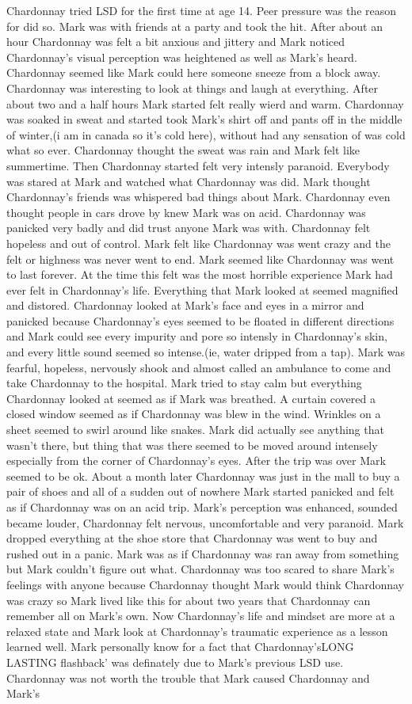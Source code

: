\documentclass[12pt]{book}
\begin{document}
Chardonnay tried LSD for the first time at age 14. Peer pressure was the reason for did so. Mark was with friends at a party and took the hit. After about an hour Chardonnay was felt a bit anxious and jittery and Mark noticed Chardonnay's visual perception was heightened as well as Mark's heard. Chardonnay seemed like Mark could here someone sneeze from a block away. Chardonnay was interesting to look at things and laugh at everything. After about two and a half hours Mark started felt really wierd and warm. Chardonnay was soaked in sweat and started took Mark's shirt off and pants off in the middle of winter,(i am in canada so it's cold here), without had any sensation of was cold what so ever. Chardonnay thought the sweat was rain and Mark felt like summertime. Then Chardonnay started felt very intensly paranoid. Everybody was stared at Mark and watched what Chardonnay was did. Mark thought Chardonnay's friends was whispered bad things about Mark. Chardonnay even thought people in cars drove by knew Mark was on acid. Chardonnay was panicked very badly and did trust anyone Mark was with. Chardonnay felt hopeless and out of control. Mark felt like Chardonnay was went crazy and the felt or highness was never went to end. Mark seemed like Chardonnay was went to last forever. At the time this felt was the most horrible experience Mark had ever felt in Chardonnay's life. Everything that Mark looked at seemed magnified and distored. Chardonnay looked at Mark's face and eyes in a mirror and panicked because Chardonnay's eyes seemed to be floated in different directions and Mark could see every impurity and pore so intensly in Chardonnay's skin, and every little sound seemed so intense.(ie, water dripped from a tap). Mark was fearful, hopeless, nervously shook and almost called an ambulance to come and take Chardonnay to the hospital. Mark tried to stay calm but everything Chardonnay looked at seemed as if Mark was breathed. A curtain covered a closed window seemed as if Chardonnay was blew in the wind. Wrinkles on a sheet seemed to swirl around like snakes. Mark did actually see anything that wasn't there, but thing that was there seemed to be moved around intensely especially from the corner of Chardonnay's eyes. After the trip was over Mark seemed to be ok. About a month later Chardonnay was just in the mall to buy a pair of shoes and all of a sudden out of nowhere Mark started panicked and felt as if Chardonnay was on an acid trip. Mark's perception was enhanced, sounded became louder, Chardonnay felt nervous, uncomfortable and very paranoid. Mark dropped everything at the shoe store that Chardonnay was went to buy and rushed out in a panic. Mark was as if Chardonnay was ran away from something but Mark couldn't figure out what. Chardonnay was too scared to share Mark's feelings with anyone because Chardonnay thought Mark would think Chardonnay was crazy so Mark lived like this for about two years that Chardonnay can remember all on Mark's own. Now Chardonnay's life and mindset are more at a relaxed state and Mark look at Chardonnay's traumatic experience as a lesson learned well. Mark personally know for a fact that Chardonnay'sLONG LASTING flashback' was definately due to Mark's previous LSD use. Chardonnay was not worth the trouble that Mark caused Chardonnay and Mark's 
\end{document}
